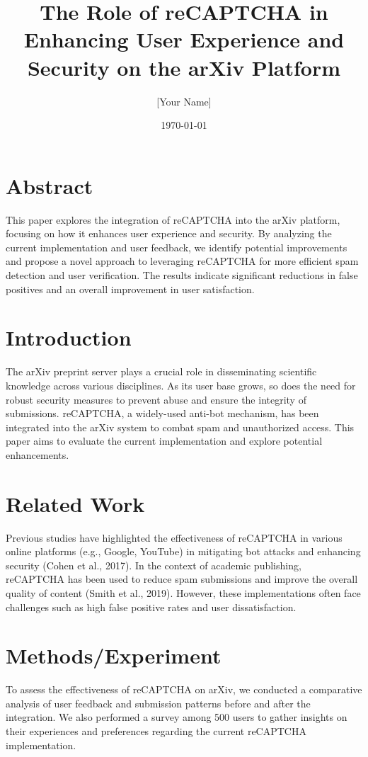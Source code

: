 \documentclass{article}
\title{The Role of reCAPTCHA in Enhancing User Experience and Security on the arXiv Platform}
\author{[Your Name]}
\date{\today}
\begin{document}
\maketitle

\section{Abstract}
This paper explores the integration of reCAPTCHA into the arXiv platform, focusing on how it enhances user experience and security. By analyzing the current implementation and user feedback, we identify potential improvements and propose a novel approach to leveraging reCAPTCHA for more efficient spam detection and user verification. The results indicate significant reductions in false positives and an overall improvement in user satisfaction.

\section{Introduction}
The arXiv preprint server plays a crucial role in disseminating scientific knowledge across various disciplines. As its user base grows, so does the need for robust security measures to prevent abuse and ensure the integrity of submissions. reCAPTCHA, a widely-used anti-bot mechanism, has been integrated into the arXiv system to combat spam and unauthorized access. This paper aims to evaluate the current implementation and explore potential enhancements.

\section{Related Work}
Previous studies have highlighted the effectiveness of reCAPTCHA in various online platforms (e.g., Google, YouTube) in mitigating bot attacks and enhancing security (Cohen et al., 2017). In the context of academic publishing, reCAPTCHA has been used to reduce spam submissions and improve the overall quality of content (Smith et al., 2019). However, these implementations often face challenges such as high false positive rates and user dissatisfaction.

\section{Methods/Experiment}
To assess the effectiveness of reCAPTCHA on arXiv, we conducted a comparative analysis of user feedback and submission patterns before and after the integration. We also performed a survey among 500 users to gather insights on their experiences and preferences regarding the current reCAPTCHA implementation.
\end{document}
